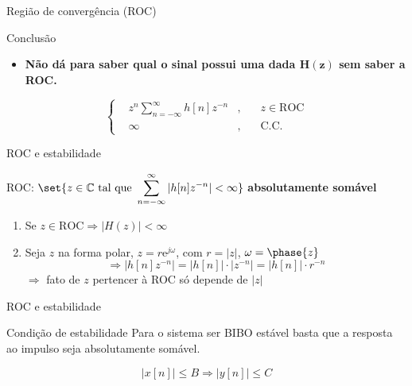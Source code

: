 \begin{frame}{Região de convergência (ROC)}
\begin{block}{Conclusão}
	
\begin{itemize}
	\item \textbf{Não dá para saber qual o sinal possui uma dada $ \bm{H(z)} $ sem saber a ROC.}
\end{itemize}

\vspace{0.5cm}

\begin{minipage}{0.4\linewidth}
	\begin{center}
		\scalebox{1}{}
	\end{center}
\end{minipage}
\hfill
\begin{minipage}{0.55\linewidth}
	$$ \left\lbrace \begin{aligned}
	&z^{n}\sum_{n=-\infty}^{\infty}h[n]z^{-n} &, &\quad z\in \text{ROC}\\
	&\infty &, &\quad \text{C.C.}
	\end{aligned} \right.  $$
\end{minipage}
	
\end{block}
\end{frame}


\begin{frame}{ROC e estabilidade}
\begin{block}{}
	ROC: $ \set{z\in\mathbb{C} \text{ tal que } \displaystyle\sum_{n=-\infty}^{\infty}|h[n]z^{-n}|<\infty} $ \textbf{absolutamente somável}
	
	\begin{enumerate}
		\item Se $ z\in \text{ROC} \Rightarrow |H(z)|<\infty $
		\item Seja $ z $ na forma polar, $ z=r\text{e}^{j\omega} $, com $ r=|z| $, $ \omega=\phase{z} $
		\[ \Rightarrow \left| h[n]z^{-n} \right|=\left|h[n] \right|\cdot \left|z^{-n} \right|=|h[n]|\cdot r^{-n} \]
		$ \Rightarrow $ fato de $ z $ pertencer à ROC só depende de $ |z| $
	\end{enumerate}

\end{block}
\end{frame}


\begin{frame}{ROC e estabilidade}
\begin{block}{Condição de estabilidade}
	Para o sistema ser BIBO estável basta que a resposta ao impulso seja absolutamente somável.
	
	\[ |x[n]|\leqslant B\Rightarrow|y[n]|\leqslant C \]
\end{block}
\end{frame}

